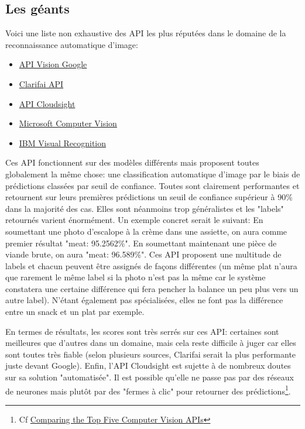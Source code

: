 \documentclass[a4paper,12pt]{report}
\begin{document}
      \subsection{Les géants}
      Voici une liste non exhaustive des API les plus réputées dans le domaine de la reconnaissance automatique d'image:
      \bigbreak
      \begin{itemize}
        \item \href{https://cloud.google.com/vision/}{API Vision Google}
        \item \href{http://blog.clarifai.com/what-food-is-this-clarifais-food-recognition-technology-can-tell-you/#.WIS1NGqmmUk}{Clarifai API}
        \item \href{http://cloudsight.ai/api}{API Cloudsight}
        \item \href{https://www.microsoft.com/cognitive-services/en-us/computer-vision-api}{Microsoft Computer Vision}
        \item \href{https://www.ibm.com/watson/developercloud/visual-recognition.html#how-it-works-block}{IBM Visual Recognition}
      \end{itemize}
      \bigbreak

      Ces API fonctionnent sur des modèles différents mais proposent toutes globalement la même chose: une classification automatique d'image par le biais de prédictions classées par seuil de confiance.
      \medbreak
      Toutes sont clairement performantes et retournent sur leurs premières prédictions un seuil de confiance supérieur à 90\% dans la majorité des cas. Elles sont néanmoins trop généralistes et les "labels" retournés varient énormément. Un exemple concret serait le suivant:
      \medbreak
      En soumettant une photo d'escalope à la crème dans une assiette, on aura comme premier résultat "meat: 95.2562\%". En soumettant maintenant une pièce de viande brute, on aura "meat: 96.589\%".
      \medbreak
      Ces API proposent une multitude de labels et chacun peuvent être assignés de façons différentes (un même plat n'aura que rarement le même label si la photo n'est pas la même car le système constatera une certaine différence qui fera pencher la balance un peu plus vers un autre label). N'étant également pas spécialisées, elles ne font pas la différence entre un snack et un plat par exemple.
      \bigbreak

      En termes de résultats, les scores sont très serrés sur ces API: certaines sont meilleures que d'autres dans un domaine, mais cela reste difficile à juger car elles sont toutes très fiable (selon plusieurs sources, Clarifai serait la plus performante juste devant Google). Enfin, l'API Cloudsight est sujette à de nombreux doutes sur sa solution "automatisée". Il est possible qu'elle ne passe pas par des réseaux de neurones mais plutôt par des "fermes à clic" pour retourner des prédictions\footnote{Cf \href{https://goberoi.com/comparing-the-top-five-computer-vision-apis-98e3e3d7c647\#.karm8bonu}{Comparing the Top Five Computer Vision APIs}}.
\end{document}

